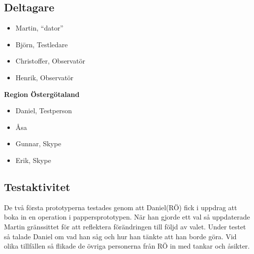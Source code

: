 \documentclass[a4paper,10pt]{article}
\begin{document}
\subsection{Deltagare}
\begin{itemize}
\item Martin, “dator”
\item Björn, Testledare
\item Christoffer, Observatör
\item Henrik, Observatör
\end{itemize}

\textbf{Region Östergötaland}
\begin{itemize}
\item Daniel, Testperson
\item Åsa
\item Gunnar, Skype
\item Erik, Skype
\end{itemize}
\subsection{Testaktivitet}
De två första prototyperna testades genom att Daniel(RÖ) fick i uppdrag att boka in en operation i pappersprototypen. När han gjorde ett val så uppdaterade Martin gränssittet för att reflektera förändringen till följd av valet. Under testet så talade Daniel om vad han såg och hur han tänkte att han borde göra. Vid olika tillfällen så flikade de övriga personerna från RÖ in med tankar och åsikter.
\end{document}
